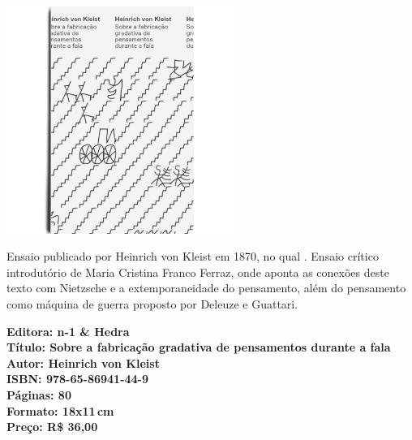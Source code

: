 \pagebreak

\begin{center}
\hspace*{-3.6cm}
\hspace*{3.1cm}\includegraphics[width=74mm]{./CAPAS/fabricacao.jpg}
\end{center}

\hspace*{-7cm}\hrulefill\hspace*{-7cm}

\medskip

\noindent{}Ensaio publicado por Heinrich von Kleist em 1870, no qual . Ensaio crítico introdutório de Maria Cristina Franco Ferraz, onde aponta as conexões deste texto com Nietzsche e a extemporaneidade do pensamento, além do pensamento como máquina de guerra proposto por Deleuze e Guattari. 

\vfill

\hspace*{-.4cm}\begin{minipage}[c]{.5\linewidth}
\small\textbf{
\hspace*{-.1cm}Editora: n-1 \& Hedra\\
Título: Sobre a fabricação gradativa de pensamentos durante a fala\\
Autor: Heinrich von Kleist\\ 
ISBN: 978-65-86941-44-9\\
Páginas: 80\\
Formato: 18x11\,cm\\
Preço: R\$ 36,00\\
}
\end{minipage}

\pagebreak

